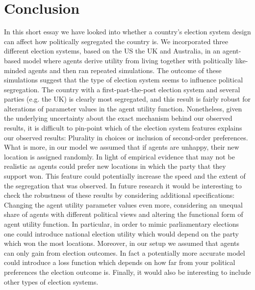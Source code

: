 \documentclass[12pt, a4paper]{article}
\begin{document}
	\section{\label{sec_conc}Conclusion}
	In this short essay we have looked into whether a country's election system design can affect how politically segregated the country is. We incorporated three different election systems, based on the US the UK and Australia, in an agent-based model where agents derive utility from living together with politically like-minded agents and then ran repeated simulations. The outcome of these simulations suggest that the type of election system seems to influence political segregation. The country with a first-past-the-post election system and several parties (e.g. the UK) is clearly most segregated, and this result is fairly robust for alterations of parameter values in the agent utility function. 
	\newline Nonetheless, given the underlying uncertainty about the exact mechanism behind our observed results, it is difficult to pin-point which of the election system features explains our observed results: Plurality in choices or inclusion of second-order preferences. What is more, in our model we assumed that if agents are unhappy, their new location is assigned randomly. In light of empirical evidence that may not be realistic as agents could prefer new locations in which the party that they support won. This feature could potentially increase the speed and the extent of the segregation that was observed. 
	\newline In future research it would be interesting to check the robustness of these results by considering additional specifications: Changing the agent utility parameter values even more, considering an unequal share of agents with different political views and altering the functional form of agent utility function. In particular, in order to mimic parliamentary elections one could introduce national election utility which would depend on the party which won the most locations. Moreover, in our setup we assumed that agents can only gain from election outcomes. In fact a potentially more accurate model could introduce a loss function which depends on how far from your political preferences the election outcome is. Finally, it would also be interesting to include other types of election systems. 
	
	
	
\end{document}

